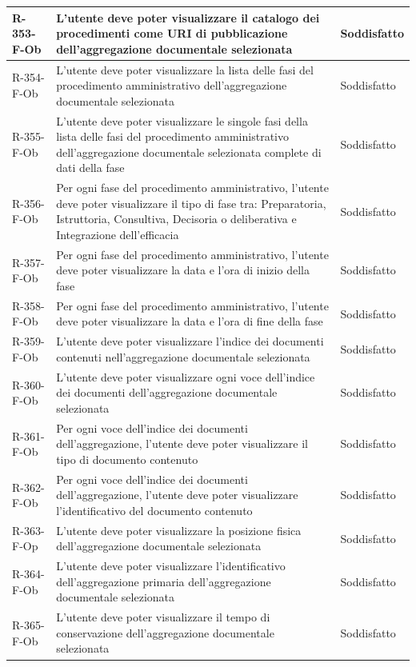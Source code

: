 \begin{longtable}{|p{2.5cm}|p{9.5cm}|p{2.5cm}|}
\hline
R-353-F-Ob & L'utente deve poter visualizzare il catalogo dei procedimenti come URI di pubblicazione dell'aggregazione documentale selezionata & Soddisfatto \\
\hline
R-354-F-Ob & L'utente deve poter visualizzare la lista delle fasi del procedimento amministrativo dell'aggregazione documentale selezionata & Soddisfatto \\
\hline
R-355-F-Ob & L'utente deve poter visualizzare le singole fasi della lista delle fasi del procedimento amministrativo dell'aggregazione documentale selezionata complete di dati della fase & Soddisfatto \\
\hline
R-356-F-Ob & Per ogni fase del procedimento amministrativo, l'utente deve poter visualizzare il tipo di fase tra: Preparatoria, Istruttoria, Consultiva, Decisoria o deliberativa e Integrazione dell'efficacia & Soddisfatto \\
\hline
R-357-F-Ob & Per ogni fase del procedimento amministrativo, l'utente deve poter visualizzare la data e l'ora di inizio della fase & Soddisfatto \\
\hline
R-358-F-Ob & Per ogni fase del procedimento amministrativo, l'utente deve poter visualizzare la data e l'ora di fine della fase & Soddisfatto \\
\hline
R-359-F-Ob & L'utente deve poter visualizzare l'indice dei documenti contenuti nell'aggregazione documentale selezionata & Soddisfatto \\
\hline
R-360-F-Ob & L'utente deve poter visualizzare ogni voce dell'indice dei documenti dell'aggregazione documentale selezionata & Soddisfatto \\
\hline
R-361-F-Ob & Per ogni voce dell'indice dei documenti dell'aggregazione, l'utente deve poter visualizzare il tipo di documento contenuto & Soddisfatto \\
\hline
R-362-F-Ob & Per ogni voce dell'indice dei documenti dell'aggregazione, l'utente deve poter visualizzare l'identificativo del documento contenuto & Soddisfatto \\
\hline
R-363-F-Op & L'utente deve poter visualizzare la posizione fisica dell'aggregazione documentale selezionata & Soddisfatto \\
\hline
R-364-F-Ob & L'utente deve poter visualizzare l'identificativo dell'aggregazione primaria dell'aggregazione documentale selezionata & Soddisfatto \\
\hline
R-365-F-Ob & L'utente deve poter visualizzare il tempo di conservazione dell'aggregazione documentale selezionata & Soddisfatto \\

\end{longtable}
